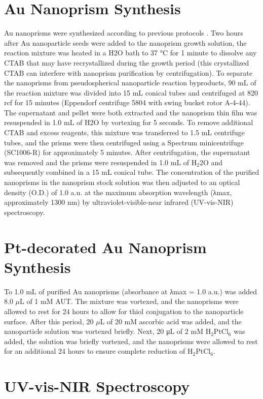 \documentclass [11pt, proquest] {uwthesis}[2016/11/22]
\begin{document}
\section{Au Nanoprism Synthesis}

Au nanoprisms were synthesized according to previous protocols \cite{MillstoneIodide,MillstonePtAu}.  Two hours after Au nanoparticle seeds were added to the nanoprism growth solution, the reaction mixture was heated in a H2O bath to 37 °C for 1 minute to dissolve any CTAB that may have recrystallized during the growth period (this crystallized CTAB can interfere with nanoprism purification by centrifugation). To separate the nanoprisms from pseudospherical nanoparticle reaction byproducts, 90 mL of the reaction mixture was divided into 15 mL conical tubes and
centrifuged at 820 rcf for 15 minutes (Eppendorf centrifuge 5804 with swing bucket rotor A-4-44). The supernatant and pellet were both extracted and the nanoprism thin film was resuspended in 1.0 mL of H2O by vortexing for 5 seconds. To remove additional CTAB and excess reagents, this mixture was transferred to 1.5 mL centrifuge tubes, and the prisms were then centrifuged using a Spectrum minicentrifuge (SC1006-R) for approximately 5 minutes. After centrifugation, the supernatant was removed and the prisms were resuspended in 1.0 mL of H$_2$2O and subsequently combined in a 15 mL conical tube. The concentration of the purified nanoprisms in the nanoprism stock solution was then adjusted to an optical density (O.D.) of 1.0 a.u. at the maximum absorption wavelength (λmax, approximately 1300 nm) by ultraviolet-visible-near infrared (UV-vis-NIR) spectroscopy.

\section{Pt-decorated Au Nanoprism Synthesis}

To 1.0 mL of purified Au nanoprisms (absorbance at λmax = 1.0 a.u.) was added 8.0 $\mu$L of 1 mM AUT. The mixture was
vortexed, and the nanoprisms were allowed to rest for 24 hours to allow for thiol conjugation to the nanoparticle surface. After this period, 20 $\mu$L of 20 mM ascorbic acid was added, and the nanoparticle solution was vortexed briefly. Next, 20 μL of 2 mM H$_2$PtCl$_6$ was added, the solution was briefly vortexed, and the nanoprisms were allowed to rest for an additional 24 hours to ensure complete reduction of H$_2$PtCl$_6$. 

\section{UV-vis-NIR Spectroscopy}
\end{document}
